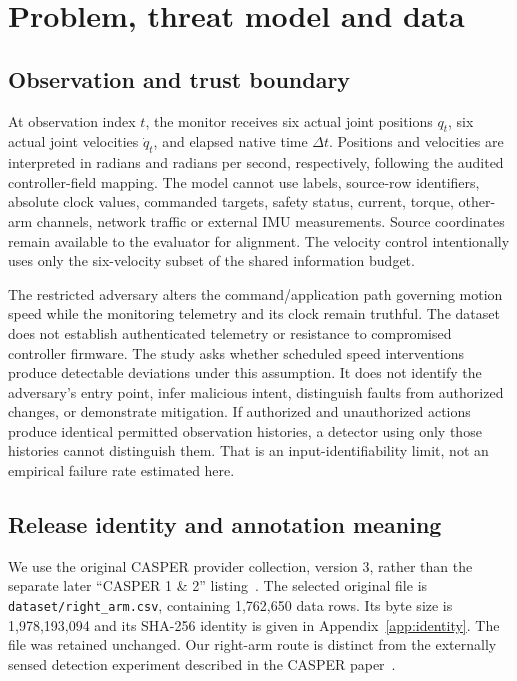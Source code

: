 \section{Problem, threat model and data}
\label{sec:data}
\subsection{Observation and trust boundary}
At observation index $t$, the monitor receives six actual joint positions $q_t$, six actual joint velocities $\dot q_t$, and elapsed native time $\Delta t$. Positions and velocities are interpreted in radians and radians per second, respectively, following the audited controller-field mapping. The model cannot use labels, source-row identifiers, absolute clock values, commanded targets, safety status, current, torque, other-arm channels, network traffic or external IMU measurements. Source coordinates remain available to the evaluator for alignment. The velocity control intentionally uses only the six-velocity subset of the shared information budget.

The restricted adversary alters the command/application path governing motion speed while the monitoring telemetry and its clock remain truthful. The dataset does not establish authenticated telemetry or resistance to compromised controller firmware. The study asks whether scheduled speed interventions produce detectable deviations under this assumption. It does not identify the adversary's entry point, infer malicious intent, distinguish faults from authorized changes, or demonstrate mitigation. If authorized and unauthorized actions produce identical permitted observation histories, a detector using only those histories cannot distinguish them. That is an input-identifiability limit, not an empirical failure rate estimated here.

\subsection{Release identity and annotation meaning}
We use the original CASPER provider collection, version 3, rather than the separate later ``CASPER 1 \& 2'' listing~\cite{casperdata}. The selected original file is \texttt{dataset/right\_arm.csv}, containing 1,762,650 data rows. Its byte size is 1,978,193,094 and its SHA-256 identity is given in Appendix~\ref{app:identity}. The file was retained unchanged. Our right-arm route is distinct from the externally sensed detection experiment described in the CASPER paper~\cite{casper2024}.

